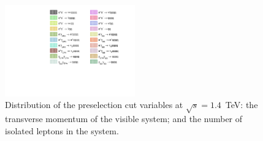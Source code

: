 \begin{figure}[h!]
\centering
{}
 \hfill
\includegraphics[width=0.5\textwidth]{PhysicsAnalysis/Plots/PreSelection/1400GeV/Legend.pdf}
\caption[Distribution of the preselection cut variables at $\sqrt{s}=1.4$~TeV: \protect{} the transverse momentum of the visible system; and \protect{} the number of isolated leptons in the system.]{Distribution of the preselection cut variables at $\sqrt{s}=1.4$~TeV: \protect{} the transverse momentum of the visible system; and \protect{} the number of isolated leptons in the system.}
\label{fig:preselection1400}
\end{figure}


